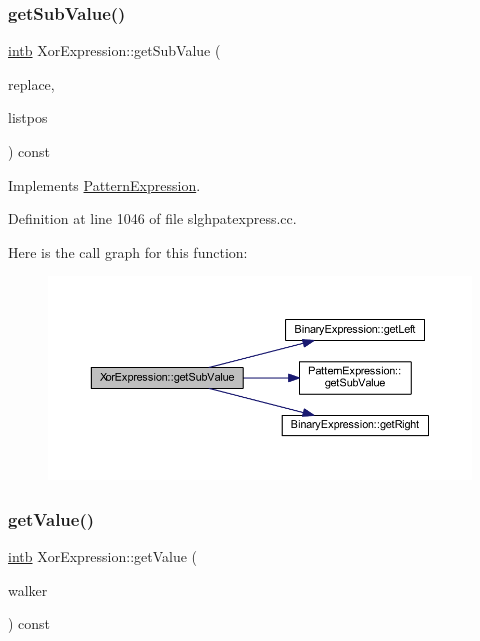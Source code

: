 \subsubsection{\texorpdfstring{getSubValue()}{getSubValue()}}
{\footnotesize\ttfamily \mbox{\hyperlink{types_8h_aa925ba3e627c2df89d5b1cfe84fb8572}{intb}} Xor\+Expression\+::get\+Sub\+Value (\begin{DoxyParamCaption}\item[{const vector$<$ \mbox{\hyperlink{types_8h_aa925ba3e627c2df89d5b1cfe84fb8572}{intb}} $>$ \&}]{replace,  }\item[{int4 \&}]{listpos }\end{DoxyParamCaption}) const\hspace{0.3cm}{\ttfamily [virtual]}}



Implements \mbox{\hyperlink{class_pattern_expression_ade37db4aa76dd442b189bf4a6bb2d9dd}{Pattern\+Expression}}.



Definition at line 1046 of file slghpatexpress.\+cc.

Here is the call graph for this function\+:
\nopagebreak
\begin{figure}[H]
\begin{center}
\leavevmode
\includegraphics[width=350pt]{class_xor_expression_a36d35fdcd9283efaa711304fed75e9e6_cgraph}
\end{center}
\end{figure}
\mbox{\label{class_xor_expression_a2f099da41343681d42dcc1b6c06a88ff}} 
\subsubsection{\texorpdfstring{getValue()}{getValue()}}
{\footnotesize\ttfamily \mbox{\hyperlink{types_8h_aa925ba3e627c2df89d5b1cfe84fb8572}{intb}} Xor\+Expression\+::get\+Value (\begin{DoxyParamCaption}\item[{\mbox{\hyperlink{class_parser_walker}{Parser\+Walker}} \&}]{walker }\end{DoxyParamCaption}) const\hspace{0.3cm}{\ttfamily [virtual]}}



